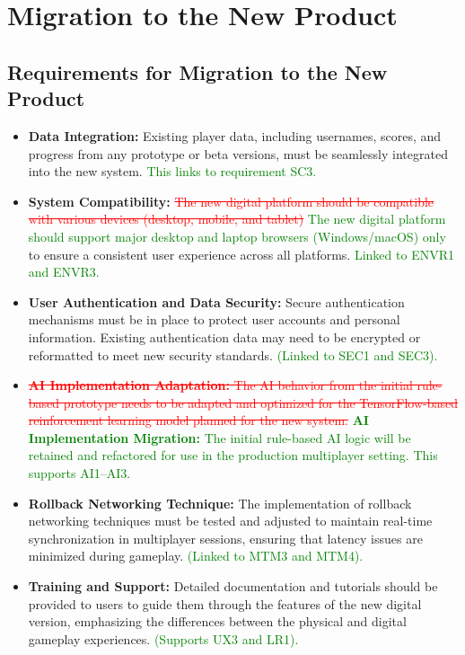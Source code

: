 \documentclass[12pt]{article}
\newcommand{\removed}[1]{\textcolor{red}{\sout{#1}}}
\newcommand{\added}[1]{\textcolor{green}{#1}}
\begin{document}
\section{Migration to the New Product}

\subsection{Requirements for Migration to the New Product}
\begin{itemize}
    \item \textbf{Data Integration:} Existing player data, including usernames, scores, and progress from any prototype or beta versions, must be seamlessly integrated into the new system. \added{This links to requirement SC3.}
    
    \item \textbf{System Compatibility:} \removed{The new digital platform should be compatible with various devices (desktop, mobile, and tablet)} \added{The new digital platform should support major desktop and laptop browsers (Windows/macOS) only} to ensure a consistent user experience across all platforms. \added{Linked to ENVR1 and ENVR3.}
    
    \item \textbf{User Authentication and Data Security:} Secure authentication mechanisms must be in place to protect user accounts and personal information. Existing authentication data may need to be encrypted or reformatted to meet new security standards. \added{(Linked to SEC1 and SEC3).}
    
    \item \removed{\textbf{AI Implementation Adaptation:} The AI behavior from the initial rule-based prototype needs to be adapted and optimized for the TensorFlow-based reinforcement learning model planned for the new system.} \added{\textbf{AI Implementation Migration:} The initial rule-based AI logic will be retained and refactored for use in the production multiplayer setting. This supports AI1–AI3.}
    
    \item \textbf{Rollback Networking Technique:} The implementation of rollback networking techniques must be tested and adjusted to maintain real-time synchronization in multiplayer sessions, ensuring that latency issues are minimized during gameplay. \added{(Linked to MTM3 and MTM4).}
    
    \item \textbf{Training and Support:} Detailed documentation and tutorials should be provided to users to guide them through the features of the new digital version, emphasizing the differences between the physical and digital gameplay experiences. \added{(Supports UX3 and LR1).}
\end{itemize}
\end{document}
